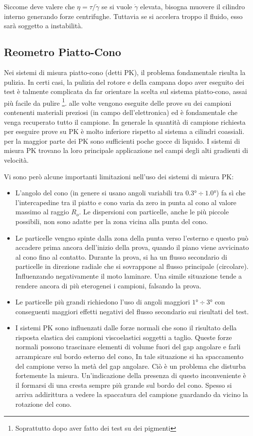 Siccome deve valere che $\eta = \tau / \dot{\gamma}$ se si vuole $\dot{\gamma}$ elevata, bisogna muovere il cilindro interno generando forze centrifughe.
Tuttavia se si accelera troppo il fluido, esso sarà soggetto a instabilità.

\subsection{Reometro Piatto-Cono}
Nei sistemi di misura piatto-cono (detti \ac{PK}), il problema fondamentale risulta la pulizia.
In certi casi, la pulizia del rotore e della campana dopo aver eseguito dei test è talmente complicata da far orientare la scelta sul sistema piatto-cono, assai più facile da pulire%
\footnote{Soprattutto dopo aver fatto dei test su dei pigmenti}.
alle volte vengono eseguite delle prove su dei campioni contenenti materiali preziosi (in campo dell'elettronica) ed è fondamentale che venga recuperato tutto il campione.
In generale la quantità di campione richiesta per eseguire prove su \ac{PK} è molto inferiore rispetto al sistema a cilindri coassiali.
per la maggior parte dei \ac{PK} sono sufficienti poche gocce di liquido.
I sistemi di misura \ac{PK} trovano la loro principale applicazione nel campi degli alti gradienti di velocità.

Vi sono però alcune importanti limitazioni nell'uso dei sistemi di misura \ac{PK}:
\begin{itemize}
\item L'angolo del cono (in genere si usano angoli variabili tra $0.3\unit{\degree} \div 1.0\unit{\degree}$) fa sì che l'intercapedine tra il piatto e cono varia da zero in punta al cono al valore massimo al raggio $R_o$. Le dispersioni con particelle, anche le più piccole possibili, non sono adatte per la zona vicina alla punta del cono.
\item Le particelle vengno spinte dalla zona della punta verso l'esterno e questo può accadere prima ancora dell'inizio della prova, quando il piano viene avvicinato al cono fino al contatto. Durante la prova, si ha un flusso secondario di particelle in direzione radiale che si sovrappone al flusso principale (circolare). Influenzando negativamente il moto laminare. Una simile situazione tende a rendere ancora di più eterogenei i campioni, falsando la prova.
\item Le particelle più grandi richiedono l'uso di angoli maggiori $1\unit{\degree} \div 3\unit{\degree}$ con conseguenti maggiori effetti negativi del flusso secondario sui risultati del test.
\item I sistemi \ac{PK} sono influenzati dalle forze normali che sono il risultato della risposta elastica dei campioni viscoelastici soggetti a taglio.
Queste forze normali possono trascinare elementi di volume fuori del gap angolare e farli arrampicare sul bordo esterno del cono, In tale situazione si ha spaccamento del campione verso la metà del gap angolare. Ciò è un problema che disturba fortemente la misura.
Un'indicazione della presenza di questo inconveniente è il formarsi di una cresta sempre più grande sul bordo del cono. Spesso si arriva addirittura a vedere la spaccatura del campione guardando da vicino la rotazione del cono.
\end{itemize} 

